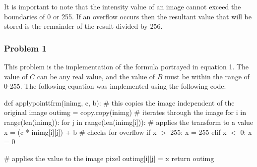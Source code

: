 \documentclass{article}
\begin{document}
	It is important to note that the intensity value of an image cannot exceed the boundaries of 0 or 255. If an overflow occurs then the resultant value that will be stored is the remainder of the result divided by 256.
	
	\subsubsection{Problem 1}
	
	This problem is the implementation of the formula portrayed in equation 1. The value of $C$ can be any real value, and the value of $B$ must be within the range of 0-255. The following equation was implemented using the following code: \newline
	
	\noindent def apply\textunderscore point\textunderscore tfrm(in\textunderscore img, c, b): \newline
	\indent \# this copies the image independent of the original image \newline
	\indent	out\textunderscore img = copy.copy(in\textunderscore img)\newline
	\newline
	\indent	\# iterates through the image \newline
	\indent	for i in range(len(in\textunderscore img)):\newline
	\indent \indent	for j in range(len(in\textunderscore img[i])):\newline
	\newline
	\indent \indent \indent		\# applies the transform to a value \newline
	\indent \indent \indent		x = (c * in\textunderscore img[i][j]) + b \newline
	\newline
	\indent \indent \indent		\# checks for overflow \newline
	\indent \indent \indent		if x $ > $ 255: \newline
	\indent \indent \indent \indent	x = 255 \newline
	\indent \indent \indent 	elif x $ < $ 0: \newline
	\indent \indent \indent \indent	x = 0 \newline
	
	\indent \indent \indent		\# applies the value to the image pixel \newline
	\indent \indent \indent		out\textunderscore img[i][j] = x \newline
	\newline
	\indent	return out\textunderscore img \newline
	
\end{document}
